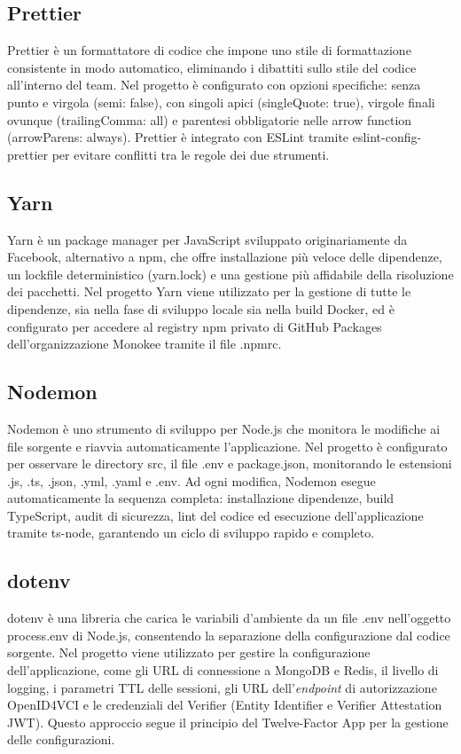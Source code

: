 \subsection{Prettier}
Prettier è un formattatore di codice che impone uno stile di formattazione consistente in modo automatico, eliminando i dibattiti sullo stile del codice all'interno del team. Nel progetto è configurato con opzioni specifiche: senza punto e virgola (semi: false), con singoli apici (singleQuote: true), virgole finali ovunque (trailingComma: all) e parentesi obbligatorie nelle arrow function (arrowParens: always). Prettier è integrato con ESLint tramite eslint-config-prettier per evitare conflitti tra le regole dei due strumenti.

\subsection{Yarn}
Yarn è un package manager per JavaScript sviluppato originariamente da Facebook, alternativo a npm, che offre installazione più veloce delle dipendenze, un lockfile deterministico (yarn.lock) e una gestione più affidabile della risoluzione dei pacchetti. Nel progetto Yarn viene utilizzato per la gestione di tutte le dipendenze, sia nella fase di sviluppo locale sia nella build Docker, ed è configurato per accedere al registry npm privato di GitHub Packages dell'organizzazione Monokee tramite il file .npmrc.

\subsection{Nodemon}
Nodemon è uno strumento di sviluppo per Node.js che monitora le modifiche ai file sorgente e riavvia automaticamente l'applicazione. Nel progetto è configurato per osservare le directory src, il file .env e package.json, monitorando le estensioni .js, .ts, .json, .yml, .yaml e .env. Ad ogni modifica, Nodemon esegue automaticamente la sequenza completa: installazione dipendenze, build TypeScript, audit di sicurezza, lint del codice ed esecuzione dell'applicazione tramite ts-node, garantendo un ciclo di sviluppo rapido e completo.

\subsection{dotenv}
dotenv è una libreria che carica le variabili d'ambiente da un file .env nell'oggetto process.env di Node.js, consentendo la separazione della configurazione dal codice sorgente. Nel progetto viene utilizzato per gestire la configurazione dell'applicazione, come gli URL di connessione a MongoDB e Redis, il livello di logging, i parametri TTL delle sessioni, gli URL dell'\textit{endpoint} di autorizzazione OpenID4VCI e le credenziali del Verifier (Entity Identifier e Verifier Attestation JWT). Questo approccio segue il principio del Twelve-Factor App per la gestione delle configurazioni.

